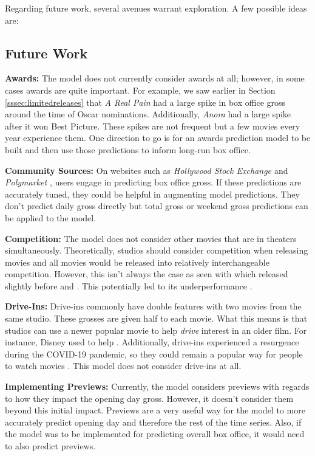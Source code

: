 \documentclass[12pt]{article}
\begin{document}
Regarding future work, several avenues warrant exploration. A few possible ideas are:

\subsection{Future Work}
\textbf{Awards:} The model does not currently consider awards at all; however, in some cases awards are quite important. For example, we saw earlier in Section \ref{sssec:limitedreleases} that \textit{A Real Pain} had a large spike in box office gross around the time of Oscar nominations. Additionally, \textit{Anora} had a large spike after it won Best Picture. These spikes are not frequent but a few movies every year experience them. One direction to go is for an awards prediction model to be built and then use those predictions to inform long-run box office.

\textbf{Community Sources:} On websites such as \textit{Hollywood Stock Exchange \citep{hsxHome}} and \textit{Polymarket \citep{polymarketHighestGrossing}}, users engage in predicting box office gross. If these predictions are accurately tuned, they could be helpful in augmenting model predictions. They don't predict daily gross directly but total gross or weekend gross predictions can be applied to the model.

\textbf{Competition:} The model does not consider other movies that are in theaters simultaneously. Theoretically, studios should consider competition when releasing movies and all movies would be released into relatively interchangeable competition. However, this isn't always the case as seen with \cite{missionImpossible} which released slightly before \cite{barbie} and \cite{oppenheimer}. This potentially led to its underperformance \citep{missionImpossible7Letdown}.

\textbf{Drive-Ins:} Drive-ins commonly have double features with two movies from the same studio. These grosses are given half to each movie. What this means is that studios can use a newer popular movie to help \textit{drive} interest in an older film. For instance, Disney used \cite{incredibles2} to help \cite{wrinkleInTime} \citep{driveInGross}. Additionally, drive-ins experienced a resurgence during the COVID-19 pandemic, so they could remain a popular way for people to watch movies \citep{driveInPandemic}. This model does not consider drive-ins at all.

\textbf{Implementing Previews:} Currently, the model considers previews with regards to how they impact the opening day gross. However, it doesn't consider them beyond this initial impact. Previews are a very useful way for the model to more accurately predict opening day and therefore the rest of the time series. Also, if the model was to be implemented for predicting overall box office, it would need to also predict previews.
\end{document}
